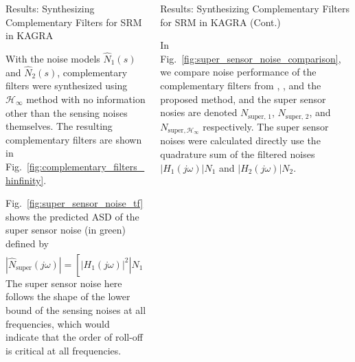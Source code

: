 \documentclass{beamer}
\begin{document}
\begin{frame}[t]
\begin{columns}[t]
\begin{column}{0.32\linewidth}
\begin{block}{Results: Synthesizing Complementary Filters for SRM in KAGRA}
				\medskip
				
				With the noise models $\hat{N}_1(s)$ and $\hat{N}_2(s)$, complementary filters were synthesized using $\mathcal{H}_\infty$ method with no information other than the sensing noises themselves.
				The resulting complementary filters are shown in Fig.~\ref{fig:complementary_filters_hinfinity}.
				
				\medskip
				
				Fig.~\ref{fig:super_sensor_noise_tf} shows the predicted ASD of the super sensor noise (in green) defined by
				\begin{equation}
					\left\vert \hat{N}_\text{super}(j\omega)\right\vert = \left[\left\vert H_1(j\omega)\right\vert^2\left\vert \hat{N}_1(j\omega)\right\vert^2 + \left\vert H_2(j\omega)\right\vert^2\left\vert \hat{N}_2(j\omega)\right\vert^2\right]^{\frac{1}{2}}\,.
				\end{equation}
				The super sensor noise here follows the shape of the lower bound of the sensing noises at all frequencies, which would indicate that the order of roll-off is critical at all frequencies.
			\end{block}
		\end{column}
	
		\begin{column}{0.32\linewidth}
			\begin{block}{Results: Synthesizing Complementary Filters for SRM in KAGRA (Cont.)}
				
			In Fig.~\ref{fig:super_sensor_noise_comparison}, we compare noise performance of the complementary filters from \cite{Sekiguchi:2016bmv}, \cite{vanHeijningen:2018cpc}, and the proposed method, and the super sensor nosies are denoted $N_\text{super, 1}$, $N_\text{super, 2}$, and $N_{\text{super},\mathcal{H}_\infty}$ respectively.
			The super sensor noises were calculated directly use the quadrature sum of the filtered noises $\vert H_1(j\omega)\vert N_1$ and $\vert H_2(j\omega)\vert N_2$.
			

\end{block}
\end{column}
\end{columns}
\end{frame}
\end{document}
